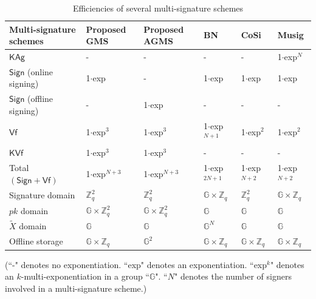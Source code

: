 \documentclass[journal]{IEEEtran}
\begin{document}
\begin{table}[htb]
\caption{Efficiencies of several multi-signature schemes}
\centering
\begin{tabularx}{\linewidth}{p{5cm}XXXXX}
\toprule Multi-signature schemes&Proposed GMS&Proposed AGMS&BN&CoSi&Musig\\
\midrule
\(\textsf{KAg}\)&- &- &- &- &1\(\cdot\)exp$^N$\\
\(\textsf{Sign}\) (online signing)&1\(\cdot\)exp&- &1\(\cdot\)exp&1\(\cdot\)exp&1\(\cdot\)exp\\
\(\textsf{Sign}\) (offline signing)&-&1\(\cdot\)exp&- &- &- \\
\(\textsf{Vf}\)&1\(\cdot\)exp$^3$&1\(\cdot\)exp$^3$&1\(\cdot\)exp$^{N+1}$&1\(\cdot\)exp$^2$&1\(\cdot\)exp$^2$\\
\(\textsf{KVf}\)&1\(\cdot\)exp$^3$&1\(\cdot\)exp$^3$&- &- &- \\
Total \((\textsf{Sign}+\textsf{Vf})\)&1\(\cdot\)exp$^{N+3}$&1\(\cdot\)exp$^{N+3}$&1\(\cdot\)exp$^{2N+1}$&1\(\cdot\)exp$^{N+2}$&1\(\cdot\)exp$^{N+2}$\\
Signature domain&\(\mathbb{Z}_q^2\)&\(\mathbb{Z}_q^2\)&\(\mathbb{G}\times \mathbb{Z}_q\)&\(\mathbb{Z}_q^2\)&\(\mathbb{G}\times \mathbb{Z}_q\)\\
\(pk\) domain&\(\mathbb{G}\times \mathbb{Z}_q^2\)&\(\mathbb{G}\times \mathbb{Z}_q^2\)&\(\mathbb{G}\)&\(\mathbb{G}\)&\(\mathbb{G}\)\\
\(\tilde{X}\) domain&\(\mathbb{G}\)&\(\mathbb{G}\)&\(\mathbb{G}^N\)&\(\mathbb{G}\)&\(\mathbb{G}\)\\
Offline storage&\(\mathbb{G}\times \mathbb{Z}_q\)&\(\mathbb{G}^2\)&\(\mathbb{G}\times \mathbb{Z}_q\)&\(\mathbb{G}\times \mathbb{Z}_q\)&\(\mathbb{G}\times \mathbb{Z}_q\)\\
\bottomrule
\end{tabularx}
\begin{tablenotes}
\small
\item (``-" denotes no exponentiation. ``exp" denotes an exponentiation. ``exp$^k$" denotes an $k$-multi-exponentiation in a group ``\(\mathbb{G}\)". ``\(N\)" denotes the number of signers involved in a multi-signature scheme.)
\end{tablenotes}
\label{fig22}
\end{table}
\end{document}
